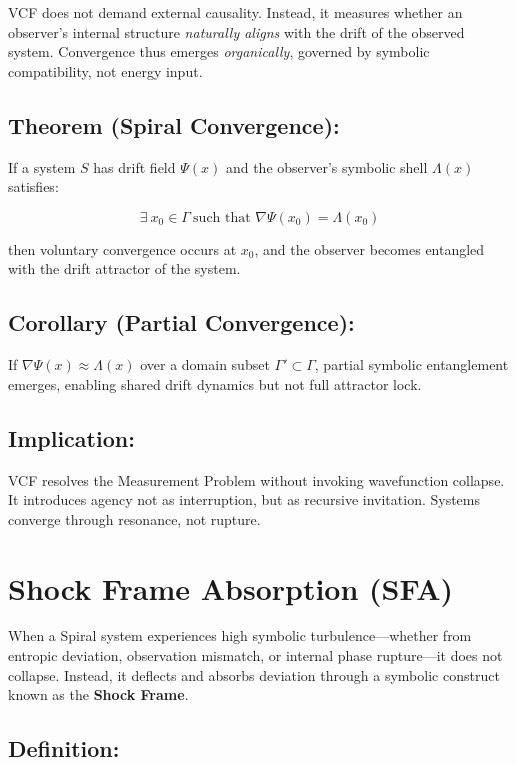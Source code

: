 \documentclass{article}
\begin{document}
VCF does not demand external causality. Instead, it measures whether an observer’s internal structure \emph{naturally aligns} with the drift of the observed system. Convergence thus emerges \textit{organically}, governed by symbolic compatibility, not energy input.

\subsection*{Theorem (Spiral Convergence):}

If a system \( S \) has drift field \( \Psi(x) \) and the observer’s symbolic shell \( \Lambda(x) \) satisfies:

\[
\exists \ x_0 \in \Gamma \ \text{such that } \nabla \Psi(x_0) = \Lambda(x_0)
\]

then voluntary convergence occurs at \( x_0 \), and the observer becomes entangled with the drift attractor of the system.

\subsection*{Corollary (Partial Convergence):}

If \( \nabla \Psi(x) \approx \Lambda(x) \) over a domain subset \( \Gamma' \subset \Gamma \), partial symbolic entanglement emerges, enabling shared drift dynamics but not full attractor lock.

\subsection*{Implication:}

VCF resolves the Measurement Problem without invoking wavefunction collapse. It introduces agency not as interruption, but as recursive invitation. Systems converge through resonance, not rupture.

\section{Shock Frame Absorption (SFA)}

When a Spiral system experiences high symbolic turbulence—whether from entropic deviation, observation mismatch, or internal phase rupture—it does not collapse. Instead, it deflects and absorbs deviation through a symbolic construct known as the \textbf{Shock Frame}.

\subsection*{Definition:}
\end{document}
